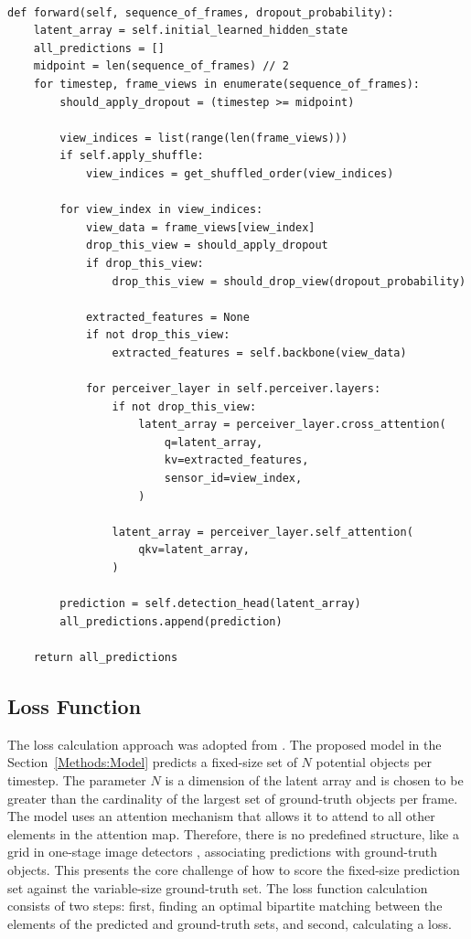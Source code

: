 \begin{verbatim}

def forward(self, sequence_of_frames, dropout_probability):
    latent_array = self.initial_learned_hidden_state
    all_predictions = []
    midpoint = len(sequence_of_frames) // 2
    for timestep, frame_views in enumerate(sequence_of_frames):
        should_apply_dropout = (timestep >= midpoint)

        view_indices = list(range(len(frame_views)))
        if self.apply_shuffle:
            view_indices = get_shuffled_order(view_indices)

        for view_index in view_indices:
            view_data = frame_views[view_index]
            drop_this_view = should_apply_dropout
            if drop_this_view:
                drop_this_view = should_drop_view(dropout_probability)

            extracted_features = None
            if not drop_this_view:
                extracted_features = self.backbone(view_data)

            for perceiver_layer in self.perceiver.layers:
                if not drop_this_view:
                    latent_array = perceiver_layer.cross_attention(
                        q=latent_array,
                        kv=extracted_features,
                        sensor_id=view_index,
                    )

                latent_array = perceiver_layer.self_attention(
                    qkv=latent_array,
                )

        prediction = self.detection_head(latent_array)
        all_predictions.append(prediction)

    return all_predictions

\end{verbatim}


\subsection{Loss Function} \label{Methods:LossFunction}

The loss calculation approach was adopted from \cite{carionEndtoEndObjectDetection2020, stewartEndtoendPeopleDetection2015}. The proposed model in the Section~\ref{Methods:Model} predicts a fixed-size set of $N$ potential objects per timestep. The parameter $N$ is a dimension of the latent array and is chosen to be greater than the cardinality of the largest set of ground-truth objects per frame. The model uses an attention mechanism that allows it to attend to all other elements in the attention map. Therefore, there is no predefined structure, like a grid in one-stage image detectors \cite{redmonYouOnlyLook2016}, associating predictions with ground-truth objects. This presents the core challenge of how to score the fixed-size prediction set against the variable-size ground-truth set. The loss function calculation consists of two steps: first, finding an optimal bipartite matching between the elements of the predicted and ground-truth sets, and second, calculating a loss.

